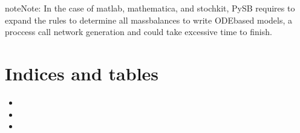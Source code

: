 \documentclass[letterpaper,10pt,english]{sphinxmanual}
\begin{document}
\begin{sphinxadmonition}{note}{Note:}
In the case of matlab, mathematica, and stochkit, PySB requires to expand
the rules to determine all mass\sphinxhyphen{}balances to write ODE\sphinxhyphen{}based models, a proccess
call network generation and could take excessive time to finish.
\end{sphinxadmonition}


\chapter{Indices and tables}
\label{\detokenize{index:indices-and-tables}}\begin{itemize}
\item {} 

\item {} 

\item {} 

\end{itemize}



\renewcommand{\indexname}{Index}
\printindex
\end{document}
